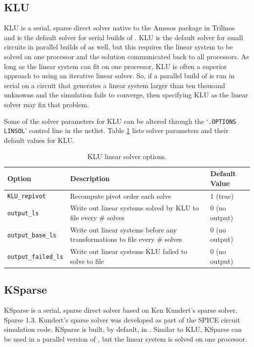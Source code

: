 \subsection{KLU}
KLU is a serial, sparse direct solver native to the Amesos package in Trilinos~\cite{trilinos:toms} and is the default solver for serial builds of \Xyce{}. 
KLU is the default solver for small circuits in parallel builds of \Xyce{} as well, but this requires the linear system to be solved 
on one processor and the solution communicated back to all processors. As long as the linear system can fit on one processor, KLU is 
often a superior approach to using an iterative linear solver.  So, if a parallel build of \Xyce{} is run in serial on a circuit that generates a linear system
larger than ten thousand unknowns and the simulation fails to converge, then specifying KLU as the linear solver may fix that problem.  

Some of the solver parameters for KLU can be altered through the `\texttt{.OPTIONS LINSOL}' control line in the netlist.  
Table \ref{tab:klu:options} lists solver parameters and their default values for KLU.
   
\begin{table}[htp]
\caption[ KLU linear solver options.] {KLU linear solver options.}
\label{tab:klu:options}
\begin{center}
\begin{tabular}{| p{3.5cm} | p{9cm} | p{2.5cm} |}
\hline
Option & Description & Default Value \\
\hline
{\tt KLU\_repivot}         & Recompute pivot order each solve & 1 (true) \\
{\tt output\_ls}           & Write out linear systems solved by KLU to file every \# solves & 0 (no output)\\
{\tt output\_base\_ls}     & Write out linear systems before any transformations to file every \# solves & 0 (no output)\\
{\tt output\_failed\_ls}   & Write out linear systems KLU failed to solve to file & 0 (no output) \\
\hline
\end{tabular}
\end{center}
\end{table}

\subsection{KSparse}
KSparse is a serial, sparse direct solver based on Ken Kundert's sparse solver, Sparse 1.3.  Kundert's sparse solver was developed 
as part of the SPICE circuit simulation code.  KSparse is built, by default, in \Xyce{}.  Similar to KLU,
KSparse can be used in a parallel version of \Xyce{}, but the linear system is solved on one processor.

